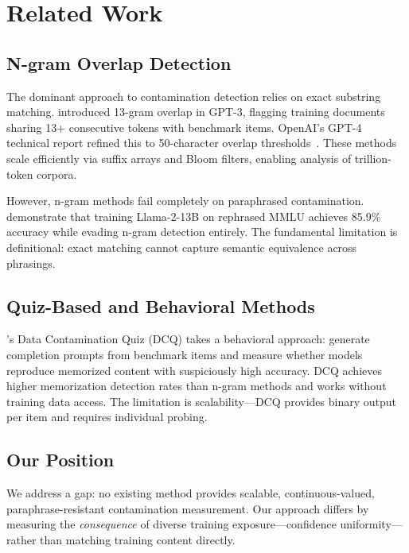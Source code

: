 \section{Related Work}

\subsection{N-gram Overlap Detection}

The dominant approach to contamination detection relies on exact substring matching. \citet{brown2020language} introduced 13-gram overlap in GPT-3, flagging training documents sharing 13+ consecutive tokens with benchmark items. OpenAI's GPT-4 technical report refined this to 50-character overlap thresholds~\citep{openai2023gpt4}. These methods scale efficiently via suffix arrays and Bloom filters, enabling analysis of trillion-token corpora.

However, n-gram methods fail completely on paraphrased contamination. \citet{yang2023rethinking} demonstrate that training Llama-2-13B on rephrased MMLU achieves 85.9\% accuracy while evading n-gram detection entirely. The fundamental limitation is definitional: exact matching cannot capture semantic equivalence across phrasings.

\subsection{Quiz-Based and Behavioral Methods}

\citet{golchin2023data}'s Data Contamination Quiz (DCQ) takes a behavioral approach: generate completion prompts from benchmark items and measure whether models reproduce memorized content with suspiciously high accuracy. DCQ achieves higher memorization detection rates than n-gram methods and works without training data access. The limitation is scalability---DCQ provides binary output per item and requires individual probing.

\subsection{Our Position}

We address a gap: no existing method provides scalable, continuous-valued, paraphrase-resistant contamination measurement. Our approach differs by measuring the \emph{consequence} of diverse training exposure---confidence uniformity---rather than matching training content directly.
